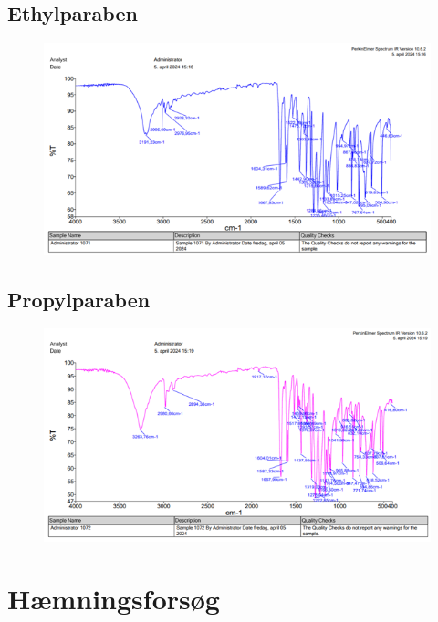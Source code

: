     \subsection{Ethylparaben}
    \begin{figure}[H] \centering
        \includegraphics[width=\textwidth]{billeder/ethylir}
        \caption{}
    \end{figure} 

    \subsection{Propylparaben}
    \begin{figure}[H] \centering
        \includegraphics[width=\textwidth]{billeder/propylir}
        \caption{}
    \end{figure} 

    \section{Hæmningsforsøg}


    
